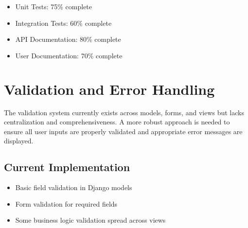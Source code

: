 \vspace{1cm}

\begin{tcolorbox}[
    enhanced,
    title={Testing and Documentation},
    attach boxed title to top left,
    boxed title style={
        colback=primary!50,
        colframe=primary!50,
        arc=0mm,
    },
    colback=white,
    colframe=primary!50,
    arc=0mm,
    fonttitle=\bfseries
]
    \begin{itemize}
        \item Unit Tests: 75\% complete
        \item Integration Tests: 60\% complete
        \item API Documentation: 80\% complete
        \item User Documentation: 70\% complete
    \end{itemize}
\end{tcolorbox}

\section{Validation and Error Handling}

\begin{tcolorbox}[
    enhanced,
    title={~70\% Complete},
    attach boxed title to top left,
    boxed title style={
        colback=warning!50,
        colframe=warning!50,
        arc=0mm,
    },
    colback=white,
    colframe=warning!50,
    arc=0mm,
    fonttitle=\bfseries
]
    The validation system currently exists across models, forms, and views but lacks centralization and comprehensiveness. A more robust approach is needed to ensure all user inputs are properly validated and appropriate error messages are displayed.
\end{tcolorbox}

\subsection{Current Implementation}
\begin{itemize}
    \item Basic field validation in Django models
    \item Form validation for required fields
    \item Some business logic validation spread across views
\end{itemize}

